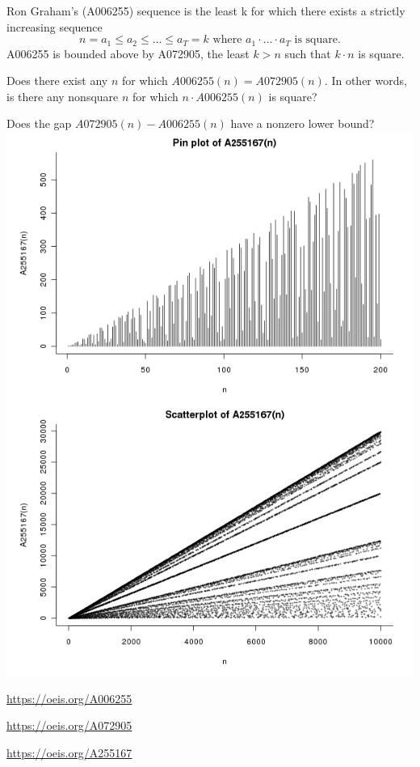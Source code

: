 \documentclass{article}
\begin{document}
Ron Graham's (A006255) sequence is the least k for which there exists a
strictly increasing sequence \[
  n = a_1 \leq a_2 \leq \hdots \leq a_T = k \text{ where }
  a_1 \cdot\hdots\cdot a_T \text{ is square.}
\]
A006255 is bounded above by A072905, the least $k > n$ such that $k\cdot n$
is square.
\begin{question}
  Does there exist any $n$ for which $A006255(n) = A072905(n)$. In other words,
  is there any nonsquare $n$ for which $n \cdot A006255(n)$ is square?
\end{question}

\begin{related}
  \item Does the gap $A072905(n) - A006255(n)$ have a nonzero lower bound?\\
    \includegraphics[trim={0cm 0 0 14cm},clip,scale=0.7]{assets/018_problem_A255167}
\end{related}

\begin{references}
  \item \url{https://oeis.org/A006255}
  \item \url{https://oeis.org/A072905}
  \item \url{https://oeis.org/A255167}
\end{references}
\end{document}
